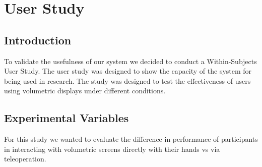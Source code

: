 \section{User Study}
\subsection{Introduction}

To validate the usefulness of our system we decided to conduct a Within-Subjects User Study. The user study was designed to show the capacity of the system for being used in research. The study was designed to test the effectiveness of users using volumetric displays under different conditions.

\subsection{Experimental Variables}

For this study we wanted to evaluate the difference in performance of participants in interacting with volumetric screens directly with their hands vs via teleoperation. 

